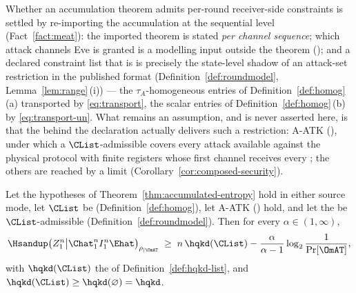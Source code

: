 
Whether an accumulation theorem admits per-round receiver-side constraints is
settled by re-importing the accumulation at the sequential level
(Fact~\ref{fact:meat}): the imported theorem is stated \emph{per channel
sequence}; which attack channels Eve is granted is a modelling input outside
the theorem (\cite[Def.~8.3, Rem.~8.4]{tupkary2026decoy}); and a declared
constraint list that is  is precisely
the state-level shadow of an attack-set restriction in the published format
\cite[Eq.~(151)]{tupkary2026decoy} (Definition~\ref{def:roundmodel},
Lemma~\ref{lem:range}\,(i)) --- the $\tau_A$-homogeneous entries of
Definition~\ref{def:homog}\,(a) transported by \eqref{eq:transport}, the
scalar entries of Definition~\ref{def:homog}\,(b) by \eqref{eq:transport-un}.
What remains an assumption, and is never asserted here, is that the
 behind the declaration actually delivers such a
restriction: A-ATK (), under which a
$\CList$-admissible  covers every attack available against the
physical protocol with finite registers whose first channel receives every
; the others are reached by a limit
(Corollary~\ref{cor:composed-security}).

\begin{theorem}\label{thm:constrained-accumulation}
Let the hypotheses of Theorem~\ref{thm:accumulated-entropy} hold in either
source mode, let $\CList$ be
(Definition~\ref{def:homog}), let A-ATK
() hold, and let the  be
$\CList$-admissible (Definition~\ref{def:roundmodel}). Then for every
$\alpha\in(1,\infty)$,
\begin{equation}\label{eq:c17}
  \Hsandup\big(Z_1^n\big|\Chat_1^nI_1^n\Ehat\big)_{\rho_{|\OmAT}}
  \;\ge\;n\,\hqkd(\CList)
  -\frac{\alpha}{\alpha-1}\log_2\frac{1}{\Pr[\OmAT]},
\end{equation}
with $\hqkd(\CList)$ the  of
Definition~\ref{def:hqkd-list}, and
$\hqkd(\CList)\ge\hqkd(\varnothing)=\hqkd$.
\end{theorem}

